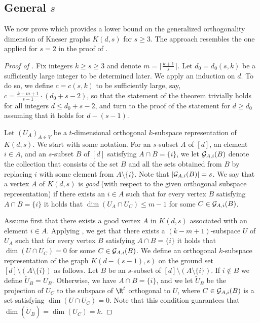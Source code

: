\documentclass{toc}
\newcommand{\calG}{{\cal G}}
\begin{document}
\subsection{General \texorpdfstring{$s$}{s}}

We now prove 
which provides a lower bound on the generalized orthogonality dimension
%
%
of Kneser graphs $K(d,s)$ for $s \geq 3$.
The approach resembles the one applied for $s=2$ in the proof of .

\begin{proof}[Proof of ]
Fix integers $k \geq s \geq 3$ and denote $m = \lceil \frac{k+1}{s} \rceil$.
Let $d_0=d_0(s,k)$ be a sufficiently large integer to be determined later.
We apply an induction on $d$.
To do so, we define $c=c(s,k)$ to be sufficiently large, say, $c=\frac{k-m+1}{s-1} \cdot (d_0+s-2)$, so that the statement of the theorem trivially holds for all integers $d \leq d_0+s-2$, and turn to
%
the proof of %
the statement for $d \geq d_0$ assuming that it holds for $d-(s-1)$.

Let $(U_A)_{A \in V}$ be a $t$-dimensional orthogonal $k$-subspace representation of $K(d,s)$.
We start with some notation.
For an $s$-subset $A$ of $[d]$, an element $i \in A$, and an $s$-subset $B$ of $[d]$ satisfying $A \cap B = \{i\}$, we let $\calG_{A,i}(B)$ denote the collection that consists of the set $B$ and all the sets obtained from $B$ by replacing $i$ with some element from $A \setminus \{i\}$. Note that $|\calG_{A,i}(B)|=s$.
We say that a vertex $A$ of $K(d,s)$ is \emph{good} (with respect to the given orthogonal subspace representation) if there exists an $i \in A$ such that for every vertex $B$ satisfying $A \cap B = \{i\}$ it holds that $\dim(U_A \cap U_C) \leq m-1$ for some $C \in \calG_{A,i}(B)$.

Assume first that there exists a good vertex $A$ in $K(d,s)$ associated with an element $i \in A$.
Applying , we get that there exists a $(k-m+1)$-subspace $U$ of $U_A$ such that for every vertex $B$ satisfying $A \cap B = \{i\}$ it holds that $\dim(U \cap U_C) =0$ for some $C \in \calG_{A,i}(B)$.
We define an orthogonal $k$-subspace representation of the graph $K(d-(s-1),s)$ on the ground set $[d] \setminus (A \setminus \{i\})$ as follows. Let $B$ be an $s$-subset of $[d] \setminus (A \setminus \{i\})$.
If $i \notin B$ we define $\widetilde{U}_B = U_B$. Otherwise, we have $A \cap B = \{i\}$, and we let $\widetilde{U}_B$ be the projection of $U_C$ to the subspace of $\R^t$ orthogonal to $U$, where $C \in \calG_{A,i}(B)$ is a set satisfying $\dim(U \cap U_C) =0$. Note that this condition guarantees that $\dim(\widetilde{U}_B) = \dim(U_C) = k$.


\end{proof}
\end{document}
